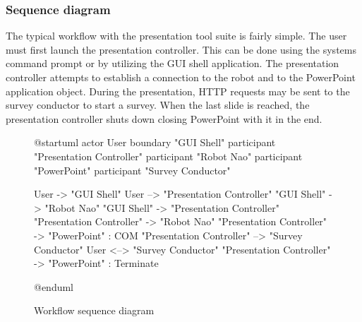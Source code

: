 \documentclass[12pt, fleqn, a4paper]{article}
\begin{document}
\subsubsection{Sequence diagram}
The typical workflow with the presentation tool suite is fairly simple. The user must first launch the presentation controller. This can be done using the systems command prompt or by utilizing the GUI shell application. 
The presentation controller attempts to establish a connection to the robot and to the PowerPoint application object. During the presentation, HTTP requests may be sent to the survey conductor to start a survey. When the last slide is reached, the presentation controller shuts down closing PowerPoint with it in the end.
\begin{figure}[H]
	\centering
	\begin{plantuml}
@startuml
actor User
boundary "GUI Shell"
participant "Presentation Controller"
participant "Robot Nao"
participant "PowerPoint"
participant "Survey Conductor"


User -> "GUI Shell"
User --> "Presentation Controller"
"GUI Shell" -> "Robot Nao"
"GUI Shell" -> "Presentation Controller"
"Presentation Controller" -> "Robot Nao"
"Presentation Controller" -> "PowerPoint" : COM
"Presentation Controller" --> "Survey Conductor"
User <--> "Survey Conductor"
"Presentation Controller" -> "PowerPoint" : Terminate

@enduml
	\end{plantuml}
	\caption{Workflow sequence diagram}

\end{figure}
\end{document}
